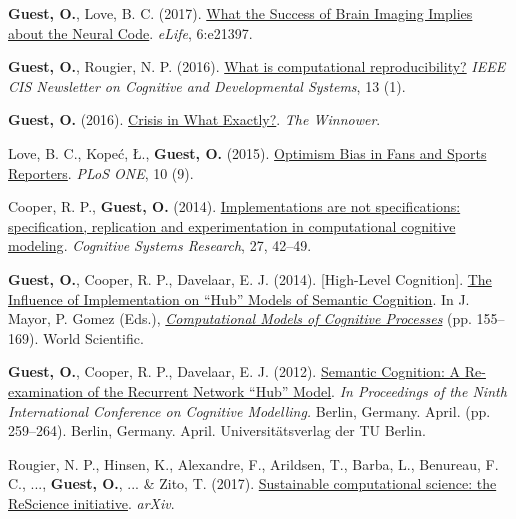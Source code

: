 \documentclass[10pt]{article}
\renewcommand{\section}[2]%
        {\pagebreak[2]\vspace{1.3\baselineskip}%
         \phantomsection\addcontentsline{toc}{section}{#1}%
         \hspace{0in}%
         \marginpar{
         \raggedright \
         
         \scshape #1}#2}
\begin{document}
\textbf{Guest, O.}, Love, B. C. (2017). \href{http://dx.doi.org/10.7554/eLife.21397}{What the Success of Brain Imaging Implies about the Neural Code}. \textit{eLife}, 6:e21397.
\vspace{5pt}

\textbf{Guest, O.}, Rougier, N. P. (2016). \href{http://oliviaguest.com/doc/guest_rougier_16.pdf}{What is computational reproducibility?} \textit{IEEE CIS Newsletter on Cognitive and Developmental Systems}, 13 (1).
\vspace{5pt}

\textbf{Guest, O.} (2016). \href{http://dx.doi.org/10.15200/winn.146590.01538}{Crisis in What Exactly?}. \textit{The Winnower}. 
\vspace{5pt}

Love, B. C., Kopeć, Ł., \textbf{Guest, O.} (2015). \href{http://dx.doi.org/10.1371/journal.pone.0137685}{Optimism Bias in Fans and Sports Reporters}. \textit{PLoS ONE}, 10 (9).
\vspace{5pt}

Cooper, R. P., \textbf{Guest, O.} (2014).  \href{http://dx.doi.org/10.1016/j.cogsys.2013.05.001}{Implementations are not specifications: specification, replication and experimentation in computational cognitive modeling}. \textit{Cognitive Systems Research}, 27, 42--49.
\vspace{5pt}

\textbf{Guest, O.}, Cooper, R. P., Davelaar, E. J. (2014).  [High-Level Cognition]. \href{http://oliviaguest.com/doc/guest_14.pdf}{The Influence of Implementation on ``Hub'' Models of Semantic Cognition}. In J. Mayor, P. Gomez (Eds.), \textit{\href{http://www.worldscientific.com/worldscibooks/10.1142/8747}{Computational Models of Cognitive Processes}} (pp. 155--169). World Scientific.
\vspace{5pt}

\textbf{Guest, O.}, Cooper, R. P., Davelaar, E. J. (2012). \href{http://eprints.bbk.ac.uk/6758/}{Semantic Cognition: A Re-examination of the Recurrent Network ``Hub'' Model}. \textit{In Proceedings of the Ninth International Conference on Cognitive Modelling.} Berlin, Germany. April. (pp. 259--264). Berlin, Germany. April. Universit\"{a}tsverlag der TU Berlin.

\section{PREPRINTS}

Rougier, N. P., Hinsen, K., Alexandre, F., Arildsen, T., Barba, L., Benureau, F. C., ..., \textbf{Guest, O.}, ... \& Zito, T. (2017). \href{https://arxiv.org/abs/1707.04393}{Sustainable computational science: the ReScience initiative}. \textit{arXiv}.
\vspace{5pt}
\end{document}
